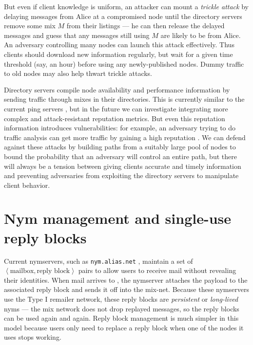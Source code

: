 \documentclass[final]{ieee}
\newcommand\emailaddr{\begingroup \def\UrlLeft{<}\def\UrlRight{>}\urlstyle{tt}\Url}
\begin{document}
But even if client knowledge is uniform, an attacker can mount a
\emph{trickle attack} by delaying messages from Alice at a compromised
node until the directory servers remove some mix $M$ from their listings
--- he can then release the delayed messages and guess that any messages
still using $M$ are likely to be from Alice. An adversary controlling
many nodes can launch this attack effectively. Thus clients
should download new information regularly,
but wait for a given time threshold (say, an hour) before using any
newly-published nodes. Dummy traffic to old nodes may also 
help thwart trickle attacks.

Directory servers compile node availability and performance information by
sending traffic through mixes in their directories. This is currently
similar to the current ping servers \cite{echolot}, but in the
future we can investigate integrating more complex and attack-resistant
reputation metrics.  But even this reputation information introduces
vulnerabilities: for example, an adversary 
trying to do traffic analysis
can get more traffic by gaining a high reputation \cite{mix-acc}. We can
defend against these attacks by building paths from a suitably large pool
of nodes \cite{casc-rep} to bound the probability that an adversary will
control an entire path, but there will always be a tension between giving
clients accurate and timely information and preventing adversaries from
exploiting the directory servers to manipulate client behavior.



\section{Nym management and single-use reply blocks}
\label{sec:nymservers}

Current nymservers, such as {\tt nym.alias.net} \cite{nym-alias-net},
maintain a set of $\left<\mbox{mailbox}, \mbox{reply block}\right>$ 
pairs to allow users to
receive mail without revealing their identities. When mail arrives to
\emailaddr{bob@nym.alias.net}, the nymserver attaches the payload to
the associated
reply block and sends it off into the mix-net. Because these nymservers
use the Type I remailer network, these reply blocks are \emph{persistent}
or \emph{long-lived} nyms --- the mix network does not drop replayed
messages, so the reply blocks can be used again and again. Reply block
management is much simpler in this model because users only need to
replace a reply block when one of the nodes it uses stops working.
\end{document}
